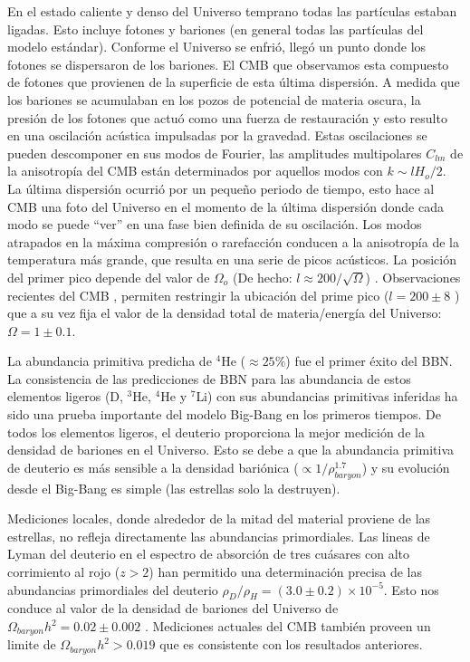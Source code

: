 En el estado caliente y denso del Universo temprano todas las partículas estaban ligadas. Esto incluye fotones y bariones (en general todas las partículas del modelo estándar). Conforme el Universo se enfrió, llegó un punto donde los fotones se dispersaron de los bariones. El CMB que observamos esta compuesto de fotones que provienen de la superficie de esta última dispersión. A medida que los bariones se acumulaban en los pozos de potencial de materia oscura, la presión de los fotones que actuó como una fuerza de restauración y esto resulto en una oscilación acústica impulsadas por la gravedad. Estas oscilaciones se pueden descomponer en sus modos de Fourier, las amplitudes multipolares $C_{lm}$ de la anisotropía del CMB están determinados por aquellos modos con $k\sim lH_o /2$. La última dispersión ocurrió por un pequeño periodo de tiempo, esto hace al CMB una foto del Universo en el momento de la última dispersión donde cada modo se puede ``ver'' en una fase bien definida de su oscilación. Los modos atrapados en la máxima compresión o rarefacción conducen a la anisotropía de la temperatura más grande, que resulta en una serie de picos acústicos. La posición del primer pico depende del valor de $\Omega_o$ (De hecho: $l \approx 200/\sqrt{\Omega}$) \cite{1999ASPC..165..431T}. Observaciones recientes del CMB \cite{ 2013ApJS..208...20B, 2020A&A...641A...1P}, permiten restringir la ubicación del prime pico ($l = 200 \pm 8$ \cite{2001ApJ...549..669H}) que a su vez fija el valor de la densidad total de materia/energía del Universo: $\Omega = 1 \pm 0.1$.

La abundancia primitiva predicha de $^4$He ($\approx 25\%$) fue el primer éxito del BBN. La consistencia de las predicciones de BBN  para las abundancia de estos elementos ligeros (D, $^3$He, $^4$He y $^7$Li) con sus abundancias primitivas inferidas ha sido una prueba importante del modelo Big-Bang en los primeros tiempos. De todos los elementos ligeros, el deuterio proporciona la mejor medición de la densidad de bariones en el Universo. Esto se debe a que la  abundancia primitiva de deuterio es más sensible a la densidad bariónica ($\propto 1/\rho_{baryon}^{1.7} $) y su evolución desde el Big-Bang es simple (las estrellas solo la destruyen).

Mediciones locales, donde alrededor de la mitad del material proviene de las estrellas, no refleja directamente las abundancias primordiales. Las lineas de Lyman del deuterio en el espectro de absorción de tres cuásares con alto corrimiento al rojo ($z>2$) han permitido una determinación precisa de las abundancias primordiales del deuterio $\rho_D/\rho_H = \left( 3.0 \pm 0.2 \right)\times 10^{-5 }$\cite{2001ApJ...552L...1B}. Esto nos conduce al valor de la densidad de bariones del Universo de $\Omega_{baryon}h^2 = 0.02 \pm 0.002$ \cite{2001ApJ...552L...1B}. Mediciones actuales del CMB también proveen un limite de $\Omega_{baryon}h^2 > 0.019$ \cite{2001ApJ...549..669H} que es consistente con los resultados anteriores.

